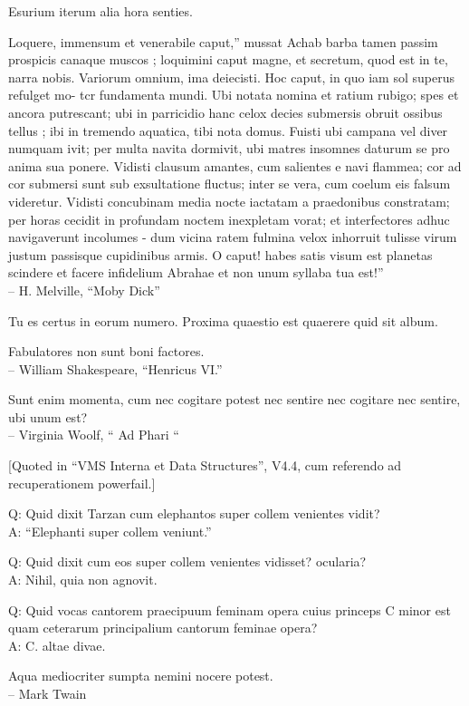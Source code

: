 \documentclass[titlepage,12pt]{memoir}
\begin{document}
Esurium iterum alia hora senties.

Loquere, immensum et venerabile caput,” mussat Achab
barba tamen passim prospicis canaque muscos ; loquimini
caput magne, et secretum, quod est in te, narra nobis. Variorum omnium,
ima deiecisti. Hoc caput, in quo iam sol superus refulget
mo- tcr fundamenta mundi. Ubi notata nomina et ratium rubigo;
spes et ancora putrescant; ubi in parricidio hanc celox
decies submersis obruit ossibus tellus ; ibi in tremendo
aquatica, tibi nota domus. Fuisti ubi campana vel
diver numquam ivit; per multa navita dormivit, ubi matres insomnes
daturum se pro anima sua ponere. Vidisti clausum amantes, cum
salientes e navi flammea; cor ad cor submersi sunt sub exsultatione
fluctus; inter se vera, cum coelum eis falsum videretur. Vidisti
concubinam media nocte iactatam a praedonibus constratam; per horas cecidit
in profundam noctem inexpletam vorat; et interfectores adhuc navigaverunt
incolumes - dum vicina ratem fulmina velox inhorruit
tulisse virum justum passisque cupidinibus armis. O caput! habes
satis visum est planetas scindere et facere infidelium Abrahae et non unum
syllaba tua est!”
\\-- H. Melville, “Moby Dick”

Tu es certus in eorum numero. Proxima quaestio est quaerere quid sit album.

Fabulatores non sunt boni factores.
\\-- William Shakespeare, “Henricus VI.”

Sunt enim momenta, cum nec cogitare potest nec sentire
nec cogitare nec sentire, ubi unum est?
\\-- Virginia Woolf, “ Ad Phari “

[Quoted in “VMS Interna et Data Structures”, V4.4, cum
referendo ad recuperationem powerfail.]

Q: Quid dixit Tarzan cum elephantos super collem venientes vidit?\\
A: “Elephanti super collem veniunt.”

Q: Quid dixit cum eos super collem venientes vidisset?
ocularia?\\
A: Nihil, quia non agnovit.

Q: Quid vocas cantorem praecipuum feminam opera cuius princeps C
minor est quam ceterarum principalium cantorum feminae opera?\\
A: C. altae divae.

Aqua mediocriter sumpta nemini nocere potest.
\\-- Mark Twain
\end{document}
